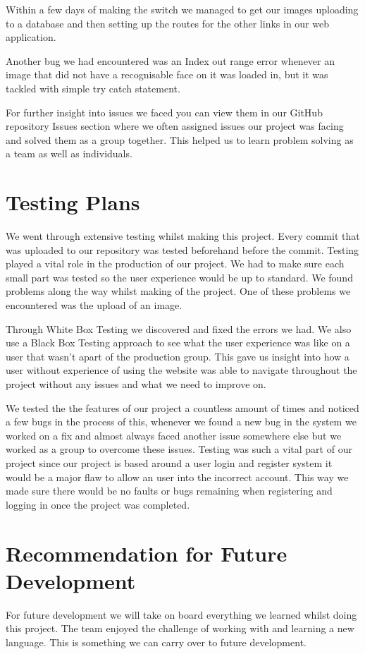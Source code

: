 \documentclass{article}
\begin{document}
\begin{flushleft}
\begin{flushleft}
Within a few days of making the switch we managed to get our images uploading to a database and then setting up the routes for the other links in our web application.

Another bug we had encountered was an Index out range error whenever an image that did not have a recognisable face on it was loaded in, but it was tackled with simple try catch statement.

For further insight into issues we faced you can view them in our GitHub repository Issues section where we often assigned issues our project was facing and solved them as a group together. This helped us to learn problem solving as a team as well as individuals.

\section{Testing Plans}
We went through extensive testing whilst making this project. Every commit that was uploaded to our repository was tested beforehand before the commit.
Testing played a vital role in the production of our project. We had to make sure each small part was tested so the user experience would be up to standard. We found problems along the way whilst making of the project. One of these problems we encountered was the upload of an image.

Through White Box Testing we discovered and fixed the errors we had. We also use a Black Box Testing approach to see what the user experience was like on a user that wasn't apart of the production group. This gave us insight into how a user without experience of using the website was able to navigate throughout the project without any issues and what we need to improve on. 

We tested the the features of our project a countless amount of times and noticed a few bugs in the process of this, whenever we found a new bug in the system we worked on a fix and almost always faced another issue somewhere else but we worked as a group to overcome these issues. Testing was such a vital part of our project since our project is based around a user login and register system it would be a major flaw to allow an user into the incorrect account. This way we made sure there would be no faults or bugs remaining when registering and logging in once the project was completed.

\section{Recommendation for Future Development}
For future development we will take on board everything we learned whilst doing this project. The team enjoyed the challenge of working with and learning a new language. This is something we can carry over to future development.


\end{flushleft}
\end{flushleft}
\end{document}
